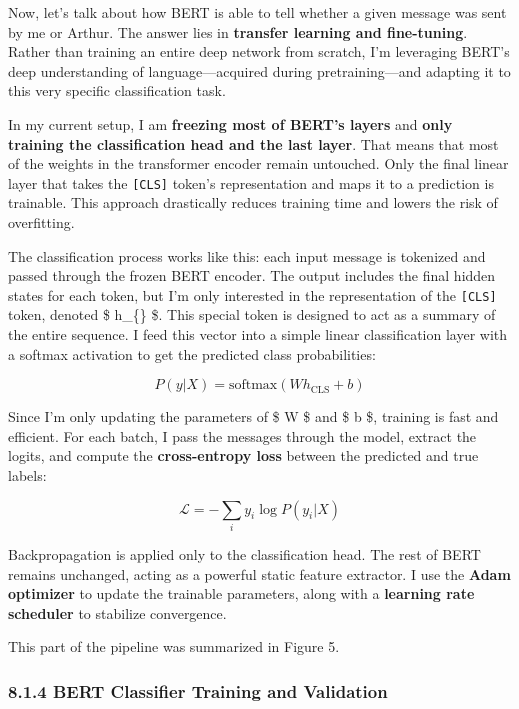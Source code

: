 \documentclass[11pt]{article}
\begin{document}
Now, let's talk about how BERT is able to tell whether a given message
was sent by me or Arthur. The answer lies in \textbf{transfer learning
and fine-tuning}. Rather than training an entire deep network from
scratch, I'm leveraging BERT's deep understanding of language---acquired
during pretraining---and adapting it to this very specific
classification task.

In my current setup, I am \textbf{freezing most of BERT's layers} and
\textbf{only training the classification head and the last layer}. That
means that most of the weights in the transformer encoder remain
untouched. Only the final linear layer that takes the \texttt{{[}CLS{]}}
token's representation and maps it to a prediction is trainable. This
approach drastically reduces training time and lowers the risk of
overfitting.

The classification process works like this: each input message is
tokenized and passed through the frozen BERT encoder. The output
includes the final hidden states for each token, but I'm only interested
in the representation of the \texttt{{[}CLS{]}} token, denoted \$
h\_\{\} \$. This special token is designed to act as a summary
of the entire sequence. I feed this vector into a simple linear
classification layer with a softmax activation to get the predicted
class probabilities:

\[
P(y | X) = \text{softmax}(W h_{\text{CLS}} + b)
\]

Since I'm only updating the parameters of \$ W \$ and \$ b \$, training
is fast and efficient. For each batch, I pass the messages through the
model, extract the logits, and compute the \textbf{cross-entropy loss}
between the predicted and true labels:

\[
\mathcal{L} = -\sum_{i} y_i \log P(y_i | X)
\]

Backpropagation is applied only to the classification head. The rest of
BERT remains unchanged, acting as a powerful static feature extractor. I
use the \textbf{Adam optimizer} to update the trainable parameters,
along with a \textbf{learning rate scheduler} to stabilize convergence.

This part of the pipeline was summarized in Figure 5.

\subsubsection{8.1.4 BERT Classifier Training and
Validation}\label{bert-classifier-training-and-validation}
\end{document}
